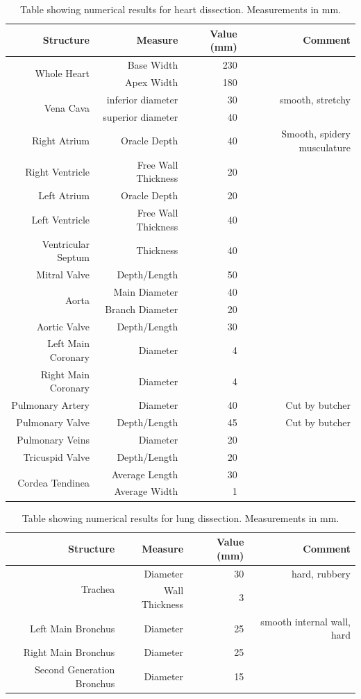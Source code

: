 \documentclass[12pt]{article}
\begin{document}
\begin{table}[h]
	\centering{}
	\caption{Table showing numerical results for heart dissection. Measurements in mm.}
	\label{tab:heart}
\begin{tabular}{|r|r|r|r|}
	\hline
Structure & Measure & Value (mm) & Comment\\
\hline
\hline
\multirow{2}{*}{Whole Heart}
& Base Width & 230 & \\
& Apex Width & 180 & \\
\hline
\multirow{2}{*}{Vena Cava}
& inferior diameter & 30 & smooth, stretchy \\
& superior diameter & 40 & \\
\hline
Right Atrium & Oracle Depth & 40 & Smooth, spidery musculature\\
\hline
Right Ventricle & Free Wall Thickness & 20 & \\
\hline
Left Atrium & Oracle Depth & 20 & \\
\hline
Left Ventricle & Free Wall Thickness& 40&\\
\hline
Ventricular Septum & Thickness & 40 &\\
\hline
Mitral Valve & Depth/Length & 50 &\\
\hline
\multirow{2}{*}{Aorta}
&Main Diameter& 40&\\
&Branch Diameter & 20&\\
\hline
Aortic Valve&Depth/Length&30&\\
\hline
Left Main Coronary&Diameter& 4&\\
\hline
Right Main Coronary & Diameter& 4 & \\
\hline
Pulmonary Artery&Diameter&40&Cut by butcher\\
\hline
Pulmonary Valve & Depth/Length&45&Cut by butcher\\
\hline
Pulmonary Veins&Diameter&20&\\
\hline
Tricuspid Valve&Depth/Length&20&\\
\hline
\multirow{2}{*}{Cordea Tendinea}
&Average Length& 30&\\
&Average Width & 1 &\\
\hline

\end{tabular}
\end{table}
\begin{table}[H]
	\centering{}
	\caption{Table showing numerical results for lung dissection. Measurements in mm.}
	\label{tab:lung}
	\begin{tabular}{|r|r|r|r|}
		\hline
		Structure & Measure & Value (mm) & Comment\\
		\hline
		\hline
		\multirow{2}{*}{Trachea}
		&Diameter&30&hard, rubbery\\
		&Wall Thickness&3&\\
		\hline
		Left Main Bronchus&Diameter&25&smooth internal wall, hard\\
		\hline
		Right Main Bronchus&Diameter&25&\\
		\hline
		Second Generation Bronchus&Diameter&15&\\
		\hline
		
	\end{tabular}
\end{table}
\end{document}
